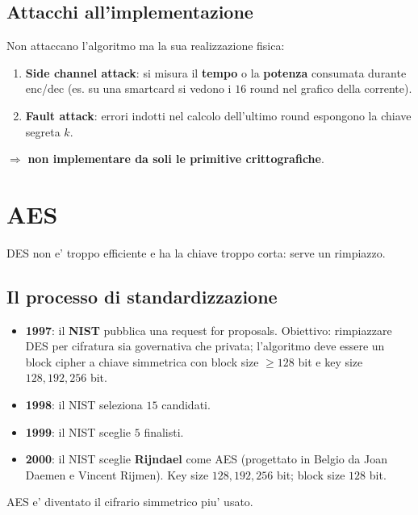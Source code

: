 \subsection{Attacchi all'implementazione}
Non attaccano l'algoritmo ma la sua realizzazione fisica:
\begin{enumerate}
  \item \textbf{Side channel attack}: si misura il \textbf{tempo} o la \textbf{potenza} consumata durante enc/dec (es. su una smartcard si vedono i $ 16 $ round nel grafico della corrente).
  \item \textbf{Fault attack}: errori indotti nel calcolo dell'ultimo round espongono la chiave segreta $ k $.
\end{enumerate}
$ \Rightarrow $ \textbf{non implementare da soli le primitive crittografiche}.

\section{AES}
DES non e' troppo efficiente e ha la chiave troppo corta: serve un rimpiazzo.

\subsection{Il processo di standardizzazione}
\begin{itemize}
  \item \textbf{1997}: il \textbf{NIST} pubblica una request for proposals. Obiettivo: rimpiazzare DES per cifratura sia governativa che privata; l'algoritmo deve essere un block cipher a chiave simmetrica con block size $ \ge 128 $ bit e key size $ 128, 192, 256 $ bit.
  \item \textbf{1998}: il NIST seleziona $ 15 $ candidati.
  \item \textbf{1999}: il NIST sceglie $ 5 $ finalisti.
  \item \textbf{2000}: il NIST sceglie \textbf{Rijndael} come AES (progettato in Belgio da Joan Daemen e Vincent Rijmen). Key size $ 128, 192, 256 $ bit; block size $ 128 $ bit.
\end{itemize}
AES e' diventato il cifrario simmetrico piu' usato.

